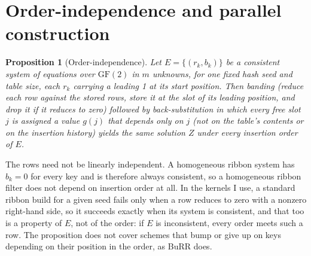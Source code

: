 \documentclass{article}
\begin{document}
\section{Order-independence and parallel construction}\label{sec:parallel}
\newtheorem{proposition}{Proposition}
\begin{proposition}[Order-independence]\label{prop:order}
Let $E=\{(r_k,b_k)\}$ be a consistent system of equations over $\mathrm{GF}(2)$ in $m$ unknowns,
for one fixed hash seed and table size, each $r_k$ carrying a leading 1 at its start position. Then banding (reduce each row against the stored
rows, store it at the slot of its leading position, and drop it if it reduces to zero) followed
by back-substitution in which every free slot $j$ is assigned a value $g(j)$ that depends only
on $j$ (not on the table's contents or on the insertion history) yields the same solution $Z$
under every insertion order of $E$.
\end{proposition}
The rows need not be linearly independent. A homogeneous ribbon system has $b_k=0$ for every key
and is therefore always consistent, so a homogeneous ribbon filter does not depend on insertion
order at all. In the kernels I use, a standard ribbon build for a given seed fails only when a
row reduces to zero with a nonzero right-hand side, so it succeeds exactly when its system is
consistent, and that too is a property of $E$, not of the order: if $E$ is inconsistent, every
order meets such a row. The proposition does not cover schemes that bump or give up on keys
depending on their position in the order, as BuRR does.
\end{document}
